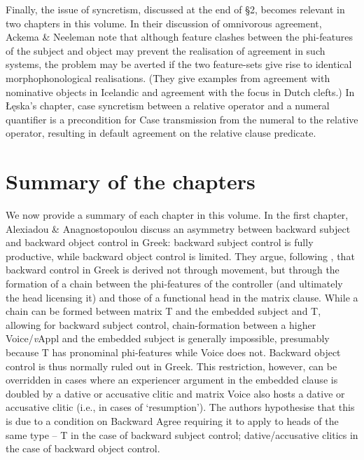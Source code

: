 \documentclass[output=paper]{langsci/langscibook}
\begin{document}
Finally, the issue of syncretism, discussed at the end of §2, becomes relevant in two chapters in this volume. In their discussion of omnivorous agreement, Ackema \& Neeleman note that although feature clashes between the phi-features of the subject and object may prevent the realisation of agreement in such systems, the problem may be averted if the two feature-sets give rise to identical morphophonological realisations. (They give examples from agreement with nominative objects in Icelandic and agreement with the focus in Dutch clefts.) In Łęska’s chapter, case syncretism between a relative operator and a numeral quantifier is a precondition for Case transmission from the numeral to the relative operator, resulting in default agreement on the relative clause predicate.

\section{Summary of the chapters}

We now provide a summary of each chapter in this volume. In the first chapter, Alexiadou \& Anagnostopoulou discuss an asymmetry between backward subject and backward object control in Greek: backward subject control is fully productive, while backward object control is limited. They argue, following \citet{TsakaliEtAl2017}, that backward control in Greek is derived not through movement, but through the formation of a chain between the phi-features of the controller (and ultimately the head licensing it) and those of a functional head in the matrix clause. While a chain can be formed between matrix T and the embedded subject and T, allowing for backward subject control, chain-formation between a higher Voice/\textit{v}Appl and the embedded subject is generally impossible, presumably because T has pronominal phi-features while Voice does not. Backward object control is thus normally ruled out in Greek. This restriction, however, can be overridden in cases where an experiencer argument in the embedded clause is doubled by a dative or accusative clitic and matrix Voice also hosts a dative or accusative clitic (i.e., in cases of ‘resumption’). The authors hypothesise that this is due to a condition on Backward Agree requiring it to apply to heads of the same type – T in the case of backward subject control; dative/accusative clitics in the case of backward object control.
\end{document}
